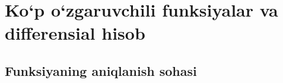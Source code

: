 \chapter{Ko`p o`zgaruvchili funksiyalar va differensial hisob}
\section{Funksiyaning aniqlanish sohasi}
